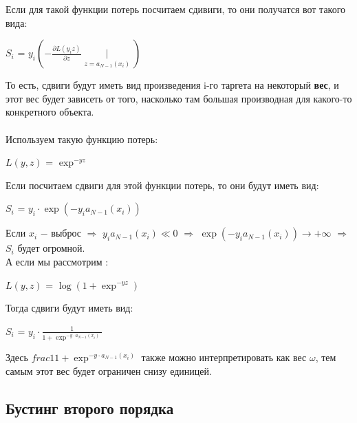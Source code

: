         Если для такой функции потерь посчитаем сдивиги, то они получатся вот такого вида:
        \begin{center}
        \large
            $S_i$ = $y_i(-\frac{\partial L(y_iz)}{\partial z}\mid\limits_{z = a_{N - 1}(x_i)})$
        \end{center}

        То есть, сдвиги будут иметь вид произведения i-го таргета на некоторый \textbf{вес}, и этот вес будет зависеть от того, насколько там большая производная для какого-то конкретного объекта.\\

        \underline{}\\

        Используем такую функцию потерь:
        \begin{center}
            $L(y, z)$ = $\exp^{-yz}$
        \end{center}

        Если посчитаем сдвиги для этой функции потерь, то они будут иметь вид:
        \begin{center}
            $S_i$ = $y_i \cdot \exp(-y_ia_{N-1}(x_i))$
        \end{center}

        Если $x_i$ $-$ выброс \quad $\Longrightarrow$ \quad $y_ia_{N - 1}(x_i) \ll 0$ \quad $\Longrightarrow$ \quad $\exp(-y_ia_{N-1}(x_i)) \longrightarrow +\infty$ \quad $\Longrightarrow$ \quad $S_i$ будет огромной.\\

        А если мы рассмотрим :
        \begin{center}
            $L(y, z)$ = $\log(1 + \exp^{-yz})$
        \end{center}

         Тогда сдвиги будут иметь вид:
         \begin{center}
         \large
             $S_i$ = $y_i \cdot \frac{1}{1 + \exp^{-y\cdot a_{N - 1}(x_i)}}$
         \end{center}

         Здесь $frac{1}{1 + \exp^{-y\cdot a_{N - 1}(x_i)}}$ также можно интерпретировать как вес $\omega$, тем самым этот вес будет ограничен снизу единицей.\\


    \subsection{Бустинг второго порядка}

